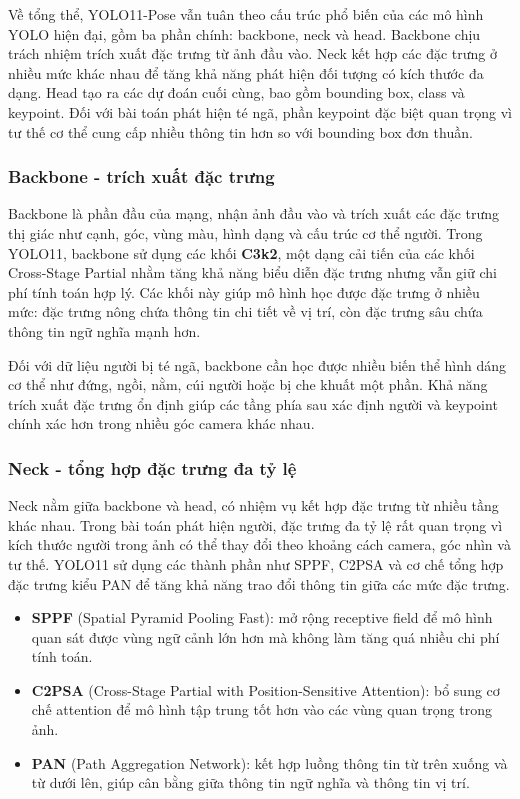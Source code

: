 \documentclass[12pt, a4paper]{article}
\begin{document}
Về tổng thể, YOLO11-Pose vẫn tuân theo cấu trúc phổ biến của các mô hình YOLO hiện đại, gồm ba phần chính: backbone, neck và head.
Backbone chịu trách nhiệm trích xuất đặc trưng từ ảnh đầu vào.
Neck kết hợp các đặc trưng ở nhiều mức khác nhau để tăng khả năng phát hiện đối tượng có kích thước đa dạng.
Head tạo ra các dự đoán cuối cùng, bao gồm bounding box, class và keypoint.
Đối với bài toán phát hiện té ngã, phần keypoint đặc biệt quan trọng vì tư thế cơ thể cung cấp nhiều thông tin hơn so với bounding box đơn thuần.

\subsubsection{Backbone - trích xuất đặc trưng}
Backbone là phần đầu của mạng, nhận ảnh đầu vào và trích xuất các đặc trưng thị giác như cạnh, góc, vùng màu, hình dạng và cấu trúc cơ thể người.
Trong YOLO11, backbone sử dụng các khối \textbf{C3k2}, một dạng cải tiến của các khối Cross-Stage Partial nhằm tăng khả năng biểu diễn đặc trưng nhưng vẫn giữ chi phí tính toán hợp lý.
Các khối này giúp mô hình học được đặc trưng ở nhiều mức: đặc trưng nông chứa thông tin chi tiết về vị trí, còn đặc trưng sâu chứa thông tin ngữ nghĩa mạnh hơn.

Đối với dữ liệu người bị té ngã, backbone cần học được nhiều biến thể hình dáng cơ thể như đứng, ngồi, nằm, cúi người hoặc bị che khuất một phần.
Khả năng trích xuất đặc trưng ổn định giúp các tầng phía sau xác định người và keypoint chính xác hơn trong nhiều góc camera khác nhau.

\subsubsection{Neck - tổng hợp đặc trưng đa tỷ lệ}
Neck nằm giữa backbone và head, có nhiệm vụ kết hợp đặc trưng từ nhiều tầng khác nhau.
Trong bài toán phát hiện người, đặc trưng đa tỷ lệ rất quan trọng vì kích thước người trong ảnh có thể thay đổi theo khoảng cách camera, góc nhìn và tư thế.
YOLO11 sử dụng các thành phần như SPPF, C2PSA và cơ chế tổng hợp đặc trưng kiểu PAN để tăng khả năng trao đổi thông tin giữa các mức đặc trưng.

\begin{itemize}
  \item \textbf{SPPF} (Spatial Pyramid Pooling Fast): mở rộng receptive field để mô hình quan sát được vùng ngữ cảnh lớn hơn mà không làm tăng quá nhiều chi phí tính toán.
  \item \textbf{C2PSA} (Cross-Stage Partial with Position-Sensitive Attention): bổ sung cơ chế attention để mô hình tập trung tốt hơn vào các vùng quan trọng trong ảnh.
  \item \textbf{PAN} (Path Aggregation Network): kết hợp luồng thông tin từ trên xuống và từ dưới lên, giúp cân bằng giữa thông tin ngữ nghĩa và thông tin vị trí.
\end{itemize}
\end{document}

